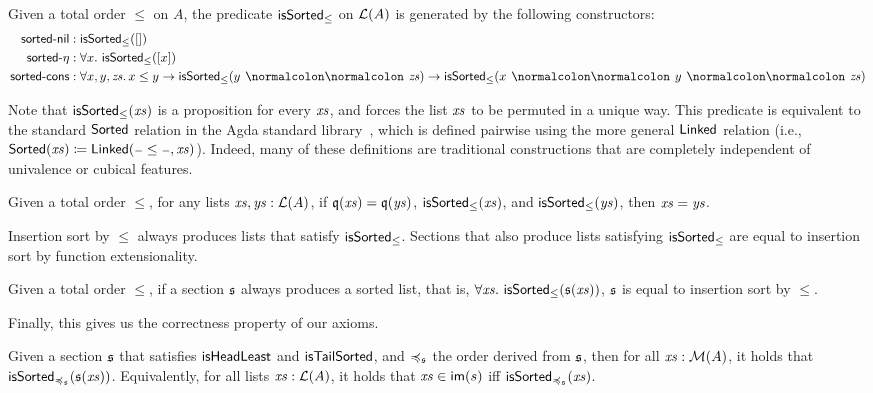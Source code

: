 \begin{definition}
    \label{def:is-sorted}
    Given a total order $\leq$ on $A$,
    the predicate $\operatorname{\mathsf{isSorted}}_{\leq}$ on $\mathcal{L}(A)$ is generated by the following constructors:
    \begin{align*}
        \term{sorted-nil}  & : \isSorted_{\leq}([])              \\
        \term{sorted-\eta} & : \forall x.\,\isSorted_{\leq}([x]) \\
        \term{sorted-cons} & : \forall x, y, \zs.\, x \leq y
        \to \isSorted_{\leq}(y \cons \zs)
        \to \isSorted_{\leq}(x \cons y \cons \zs)
    \end{align*}
\end{definition}
%
Note that $\operatorname{\mathsf{isSorted}}_{\leq}(\mathit{xs})$ is a proposition for every $\mathit{xs}$,
and forces the list $\mathit{xs}$ to be permuted in a unique way.
This predicate is equivalent to the standard $\mathsf{Sorted}$ relation in the Agda standard library~\cite{Daggitt_The_Agda_standard_2025}, which is defined pairwise using the more general $\mathsf{Linked}$ relation (i.e., $\type{Sorted}(\xs) \defeq \type{Linked}(\blank\leq\blank, \xs)$).
Indeed, many of these definitions are traditional constructions that are completely independent of univalence or cubical features.
\begin{lemma}
    Given a total order $\leq$, for any lists $\mathit{xs}, \mathit{ys} : \mathcal{L}(A)$,
    if $\mathfrak{q}(\mathit{xs}) = \mathfrak{q}(\mathit{ys})$, $\operatorname{\mathsf{isSorted}}_{\leq}(\mathit{xs})$, and $\operatorname{\mathsf{isSorted}}_{\leq}(\mathit{ys})$,
    then $\mathit{xs} = \mathit{ys}$.
\end{lemma}
%
Insertion sort by $\leq$ always produces lists that satisfy $\operatorname{\mathsf{isSorted}}_{\leq}$.
Sections that also produce lists satisfying $\operatorname{\mathsf{isSorted}}_{\leq}$ are equal to insertion sort
by function extensionality.
%
\begin{proposition}
    \label{sort:sort-uniq}
    Given a total order $\leq$,
    if a section $\mathfrak{s}$ always produces a sorted list, that is, $\forall \mathit{xs}.\,\operatorname{\mathsf{isSorted}}_{\leq}(\mathfrak{s}(\mathit{xs}))$,
    $\mathfrak{s}$ is equal to insertion sort by $\leq$.
\end{proposition}
%
Finally, this gives us the correctness property of our axioms.
%
\begin{proposition}
    \label{sort:well-behave-sorts}
    Given a section $\mathfrak{s}$ that satisfies $\operatorname{\mathsf{isHeadLeast}}$ and $\operatorname{\mathsf{isTailSorted}}$,
    and $\preccurlyeq_{\mathfrak{s}}$ the order derived from $\mathfrak{s}$, then for all $\mathit{xs} : \mathcal{M}(A)$,
    it holds that $\operatorname{\mathsf{isSorted}}_{\preccurlyeq_{\mathfrak{s}}}(\mathfrak{s}(\mathit{xs}))$.
    Equivalently, for all lists $\mathit{xs} : \mathcal{L}(A)$,
    it holds that
    $\xs \in \im{s}$ iff $\operatorname{\mathsf{isSorted}}_{\preccurlyeq_{\mathfrak{s}}}(\mathit{xs})$.
\end{proposition}
